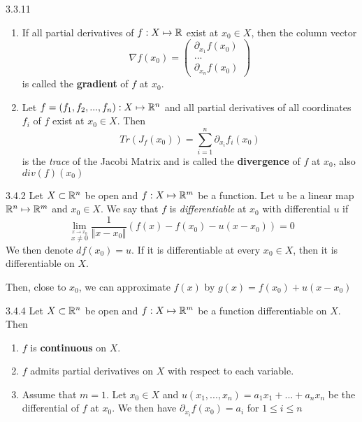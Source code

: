 \begin{definition}{3.3.11}
    \begin{enumerate}
        \item If all partial derivatives of $f: X \mapsto \mathbb{R}$ exist at $x_0 \in X$, then the column vector
              \[ \nabla f(x_0) = \begin{pmatrix}
                      \partial_{x_1} f(x_0) \\
                      ...                   \\
                      \partial_{x_n} f(x_0)
                  \end{pmatrix} \]
              is called the \textbf{gradient} of $f$ at $x_0$.
        \item Let $f = (f_1, f_2, ..., f_n): X \mapsto \mathbb{R}^n$ and all partial derivatives of all coordinates $f_i$ of $f$ exist at $x_0 \in X$. Then
              \[ Tr(J_f(x_0)) = \sum_{i=1}^{n} \partial_{x_i} f_i(x_0) \]
              is the \textit{trace} of the Jacobi Matrix and is called the \textbf{divergence} of $f$ at $x_0$, also $div(f)(x_0)$
    \end{enumerate}

\end{definition}

\begin{definition}{3.4.2}
    Let $X \subset \mathbb{R}^n$ be open and $f: X \mapsto \mathbb{R}^m$ be a function.
    Let $u$ be a linear map $\mathbb{R}^n \mapsto \mathbb{R}^m$ and $x_0 \in X$. We say that $f$ is \textit{differentiable} at
    $x_0$ with differential $u$ if
    \[ \lim_{\stackrel{x \to x_0}{x \ne 0}} \frac{1}{\Vert x - x_0 \Vert}(f(x) - f(x_0) - u(x - x_0)) = 0 \]
    We then denote $df(x_0) = u$. If it is differentiable at every $x_0 \in X$, then it is differentiable on $X$.

    Then, close to $x_0$, we can approximate $f(x)$ by $g(x) = f(x_0) + u(x - x_0)$
\end{definition}

\begin{proposition}{3.4.4}
    Let $X \subset \mathbb{R}^n$ be open and $f: X \mapsto \mathbb{R}^m$ be a function differentiable on $X$. Then
    \begin{enumerate}
        \item $f$ is \textbf{continuous} on $X$.
        \item $f$ admits partial derivatives on $X$ with respect to each variable.
        \item Assume that $m = 1$. Let $x_0 \in X$ and $u(x_1, ..., x_n) = a_1 x_1 + ... + a_n x_n$ be the differential of $f$ at $x_0$.
              We then have $\partial_{x_i} f(x_0) = a_i$ for $1 \le i \le n$
    \end{enumerate}
\end{proposition}


